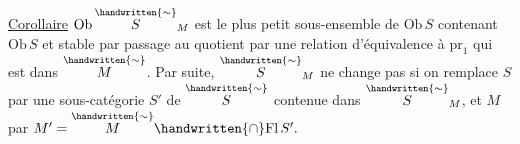 \uline{Corollaire} \quad $\mathrm{Ob}\,\overset{\handwritten{\sim}}{S}_M$ est le plus petit sous-ensemble de $\mathrm{Ob}\,S$ contenant $\mathrm{Ob}\,S$ et stable par  passage au quotient par une relation d'équivalence à $\mathrm{pr}_1$ qui est dans $\overset{\handwritten{\sim}}{M}$. Par suite,  $\overset{\handwritten{\sim}}{S}_M$ ne change pas si on remplace $S$ par une sous-catégorie $S'$ de $\overset{\handwritten{\sim}}{S}$ contenue dans $\overset{\handwritten{\sim}}{S}_M$, et $M$ par $M'=\overset{\handwritten{\sim}}{M}\handwritten{\cap}\mathrm{Fl}\,S'.$

